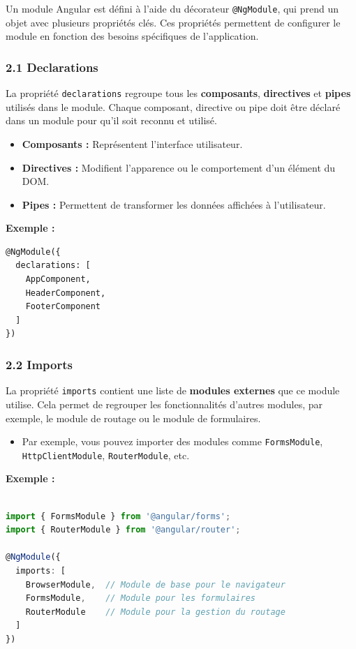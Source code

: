 \documentclass{article}
\begin{document}
Un module Angular est défini à l’aide du décorateur \texttt{@NgModule}, qui prend un objet avec plusieurs propriétés clés. Ces propriétés permettent de configurer le module en fonction des besoins spécifiques de l'application.

\subsubsection*{2.1 Declarations}
La propriété \texttt{declarations} regroupe tous les \textbf{composants}, \textbf{directives} et \textbf{pipes} utilisés dans le module. Chaque composant, directive ou pipe doit être déclaré dans un module pour qu’il soit reconnu et utilisé.

\begin{itemize}
    \item \textbf{Composants :} Représentent l’interface utilisateur.
    \item \textbf{Directives :} Modifient l’apparence ou le comportement d’un élément du DOM.
    \item \textbf{Pipes :} Permettent de transformer les données affichées à l'utilisateur.
\end{itemize}

\textbf{Exemple :}  
\begin{verbatim}
@NgModule({
  declarations: [
    AppComponent,
    HeaderComponent,
    FooterComponent
  ]
})
\end{verbatim}

\subsubsection*{2.2 Imports}
La propriété \texttt{imports} contient une liste de \textbf{modules externes} que ce module utilise. Cela permet de regrouper les fonctionnalités d’autres modules, par exemple, le module de routage ou le module de formulaires.

\begin{itemize}
    \item Par exemple, vous pouvez importer des modules comme \texttt{FormsModule}, \texttt{HttpClientModule}, \texttt{RouterModule}, etc.
\end{itemize}

\textbf{Exemple :}  
\begin{lstlisting}[language=TypeScript, caption={Using a service in a component}, label={lst:typescript-service-usage}]

import { FormsModule } from '@angular/forms';
import { RouterModule } from '@angular/router';

@NgModule({
  imports: [
    BrowserModule,  // Module de base pour le navigateur
    FormsModule,    // Module pour les formulaires
    RouterModule    // Module pour la gestion du routage
  ]
})
\end{lstlisting}
\end{document}
